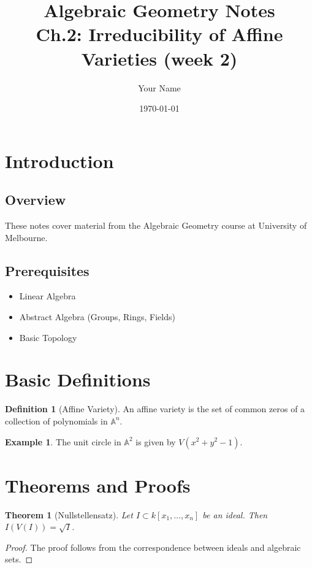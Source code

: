 \documentclass[12pt, a4paper]{article}
\title{\textbf{Algebraic Geometry Notes}\\[0.3em]
\large Ch.2: Irreducibility of Affine Varieties (week 2)}
\author{Your Name}
\date{\today}
\newtheorem{theorem}{Theorem}
\theoremstyle{definition}
\newtheorem{definition}{Definition}
\newtheorem{example}{Example}
\begin{document}
\maketitle

\tableofcontents
\newpage

\section{Introduction}

\subsection{Overview}
These notes cover material from the Algebraic Geometry course at University of Melbourne.

\subsection{Prerequisites}
\begin{itemize}
    \item Linear Algebra
    \item Abstract Algebra (Groups, Rings, Fields)
    \item Basic Topology
\end{itemize}

\section{Basic Definitions}

\begin{definition}[Affine Variety]
    An affine variety is the set of common zeros of a collection of polynomials in $\mathbb{A}^n$.
\end{definition}

\begin{example}
    The unit circle in $\mathbb{A}^2$ is given by $V(x^2 + y^2 - 1)$.
\end{example}

\section{Theorems and Proofs}

\begin{theorem}[Nullstellensatz]
    Let $I \subset k[x_1, \ldots, x_n]$ be an ideal. Then $I(V(I)) = \sqrt{I}$.
\end{theorem}

\begin{proof}
    The proof follows from the correspondence between ideals and algebraic sets.
\end{proof}
\end{document}

